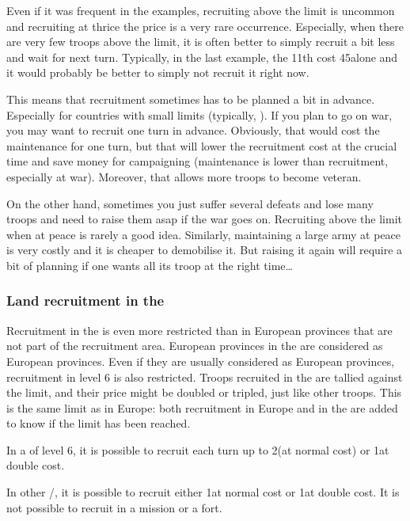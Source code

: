 \begin{playtip}
  Even if it was frequent in the examples, recruiting above the limit is
  uncommon and recruiting at thrice the price is a very rare
  occurrence. Especially, when there are very few troops above the limit, it
  is often better to simply recruit a bit less and wait for next
  turn. Typically, in the last example, the 11th \LD cost 45\ducats alone and
  it would probably be better to simply not recruit it right now.

  This means that recruitment sometimes has to be planned a bit in
  advance. Especially for countries with small limits (typically, \ANG). If
  you plan to go on war, you may want to recruit one turn in
  advance. Obviously, that would cost the maintenance for one turn, but that
  will lower the recruitment cost at the crucial time and save money for
  campaigning (maintenance is lower than recruitment, especially at
  war). Moreover, that allows more troops to become veteran.

  On the other hand, sometimes you just suffer several defeats and lose many
  troops and need to raise them asap if the war goes on. Recruiting above the
  limit when at peace is rarely a good idea. Similarly, maintaining a large
  army at peace is very costly and it is cheaper to demobilise it. But raising
  it again will require a bit of planning if one wants all its troop at the
  right time\ldots
\end{playtip}


\subsubsection{Land recruitment in the \ROTW}
\aparag Recruitment in the \ROTW is even more restricted than in European
provinces that are not part of the recruitment area.
\bparag European provinces in the \ROTW are considered as European provinces.
\bparag Even if they are usually considered as European provinces, recruitment
in level 6 \COL is also restricted.
\bparag Troops recruited in the \ROTW are tallied against the limit, and their
price might be doubled or tripled, just like other troops. This is the same
limit as in Europe: both recruitment in Europe and in the \ROTW are added to
know if the limit has been reached.

 In a \COL of level 6, it is possible to recruit each
turn up to 2\LD (at normal cost) or 1\ARMY\Facemoins at double cost.

 In other \COL/\TP, it is possible to recruit
either 1\LDE at normal cost or 1\LD at double cost.
\bparag It is not possible to recruit in a mission or a fort.

